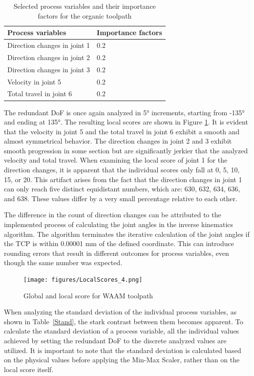 \begin{table}[H]
	\centering
	\caption{Selected process variables and their importance factors for the organic toolpath}
	\begin{tabular}{||l|l||}
		Process variables& Importance factors \\
		\hline
		\hline
		\hline
		Direction changes in joint 1	&		0.2 \\
		Direction changes in joint 2	&		0.2 \\
		Direction changes in joint 3	&		0.2 \\
		Velocity in joint 5	&		0.2 \\
		Total travel in joint 6	&		0.2 \\
		\hline
		\hline
	\end{tabular}
	
	
	\label{ravenparams}
\end{table}

The redundant \acrshort{DoF} is once again analyzed in 5° increments, starting from -135° and ending at 135°. The resulting local scores are shown in Figure \ref{LS4}. It is evident that the velocity in joint 5 and the total travel in joint 6 exhibit a smooth and almost symmetrical behavior. The direction changes in joint 2 and 3 exhibit smooth progression in some section but are significantly jerkier that the analyzed velocity and total travel. When examining the local score of joint 1 for the direction changes, it is apparent that the individual scores only fall at 0, 5, 10, 15, or 20. This artifact arises from the fact that the direction changes in joint 1 can only reach five distinct equidistant numbers, which are: 630, 632, 634, 636, and 638. These values differ by a very small percentage relative to each other.

The difference in the count of direction changes can be attributed to the implemented process of calculating the joint angles in the inverse kinematics algorithm. The algorithm terminates the iterative calculation of the joint angles if the \acrshort{TCP} is within 0.00001 mm of the defined coordinate. This can introduce rounding errors that result in different outcomes for process variables, even though the same number was expected.

\begin{figure}[H]
	\centerline{\texttt{[image: figures/LocalScores\_4.png]}}
	\caption{Global and local score for WAAM toolpath}
	\label{LS4}
\end{figure}

When analyzing the standard deviation of the individual process variables, as shown in Table~\ref{Stand}, the stark contrast between them becomes apparent. To calculate the standard deviation of a process variable, all the individual values achieved by setting the redundant \acrshort{DoF} to the discrete analyzed values are utilized. It is important to note that the standard deviation is calculated based on the physical values before applying the Min-Max Scaler, rather than on the local score itself.

